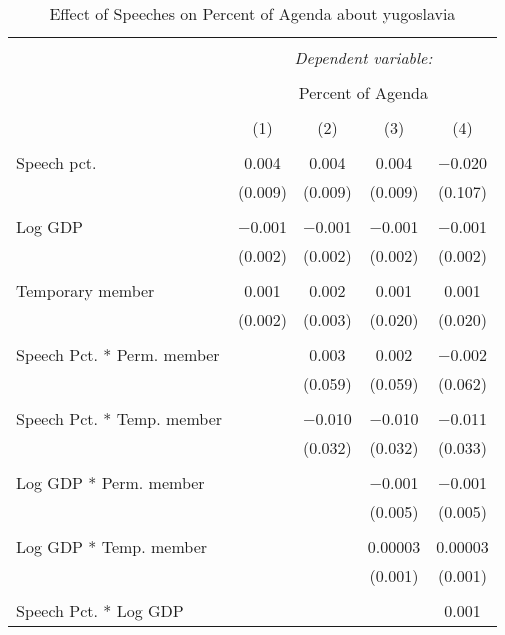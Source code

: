 
\begin{table}[!htbp] \centering 
  \caption{Effect of Speeches on Percent of Agenda about  yugoslavia} 
  \label{} 
\begin{tabular}{@{\extracolsep{5pt}}lcccc} 
\\[-1.8ex]\hline 
\hline \\[-1.8ex] 
 & \multicolumn{4}{c}{\textit{Dependent variable:}} \\ 
\cline{2-5} 
\\[-1.8ex] & \multicolumn{4}{c}{Percent of Agenda} \\ 
\\[-1.8ex] & (1) & (2) & (3) & (4)\\ 
\hline \\[-1.8ex] 
 Speech pct. & 0.004 & 0.004 & 0.004 & $-$0.020 \\ 
  & (0.009) & (0.009) & (0.009) & (0.107) \\ 
  & & & & \\ 
 Log GDP & $-$0.001 & $-$0.001 & $-$0.001 & $-$0.001 \\ 
  & (0.002) & (0.002) & (0.002) & (0.002) \\ 
  & & & & \\ 
 Temporary member & 0.001 & 0.002 & 0.001 & 0.001 \\ 
  & (0.002) & (0.003) & (0.020) & (0.020) \\ 
  & & & & \\ 
 Speech Pct. * Perm. member &  & 0.003 & 0.002 & $-$0.002 \\ 
  &  & (0.059) & (0.059) & (0.062) \\ 
  & & & & \\ 
 Speech Pct. * Temp. member &  & $-$0.010 & $-$0.010 & $-$0.011 \\ 
  &  & (0.032) & (0.032) & (0.033) \\ 
  & & & & \\ 
 Log GDP * Perm. member &  &  & $-$0.001 & $-$0.001 \\ 
  &  &  & (0.005) & (0.005) \\ 
  & & & & \\ 
 Log GDP * Temp. member &  &  & 0.00003 & 0.00003 \\ 
  &  &  & (0.001) & (0.001) \\ 
  & & & & \\ 
 Speech Pct. * Log GDP &  &  &  & 0.001 \\ 

\end{tabular}
\end{table}

